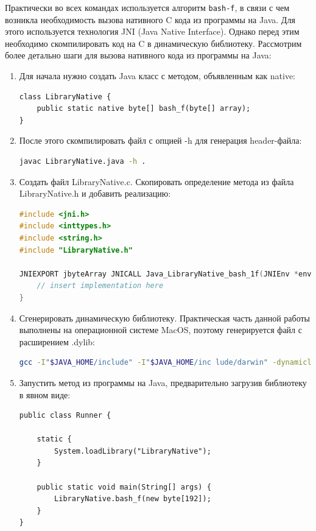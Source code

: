 	Практически во всех командах используется алгоритм \texttt{bash-f}, в связи с чем возникла необходимость
	вызова нативного C кода из программы на Java. Для этого используется технология JNI (Java 
	Native Interface). Однако перед этим необходимо скомпилировать код на C в динамическую библиотеку.
	Рассмотрим более детально шаги для вызова нативного кода из программы на Java:
	
	\begin{enumerate}
		\item Для начала нужно создать Java класс с методом, объявленным как native:
		\begin{lstlisting}
class LibraryNative {
	public static native byte[] bash_f(byte[] array);
}
		\end{lstlisting}
		\item После этого скомпилировать файл с опцией -h для генерация header-файла:
		\begin{lstlisting}[language=Bash]
javac LibraryNative.java -h .
		\end{lstlisting}
		\item Создать файл LibraryNative.c. Скопировать определение метода из файла LibraryNative.h
		и добавить реализацию:
		\begin{lstlisting}[language=C]
#include <jni.h>
#include <inttypes.h>
#include <string.h>
#include "LibraryNative.h"

JNIEXPORT jbyteArray JNICALL Java_LibraryNative_bash_1f(JNIEnv *env, jclass thisClass, jbyteArray inJNIArray) {
	// insert implementation here
}
		\end{lstlisting}
		\item Сгенерировать динамическую библиотеку. Практическая часть данной работы выполнены на 
		операционной системе MacOS, поэтому генерируется файл с расширением .dylib:
		\begin{lstlisting}[language=Bash]
gcc -I"$JAVA_HOME/include" -I"$JAVA_HOME/inc lude/darwin" -dynamiclib -o libLibraryNative.dylib LibraryNative.c
		\end{lstlisting}
		\item Запустить метод из программы на Java, предварительно загрузив библиотеку в явном виде:
		\begin{lstlisting}
public class Runner {
	
	static {
		System.loadLibrary("LibraryNative");
	}

	public static void main(String[] args) {
		LibraryNative.bash_f(new byte[192]);
	}
}
		\end{lstlisting}
	\end{enumerate}

